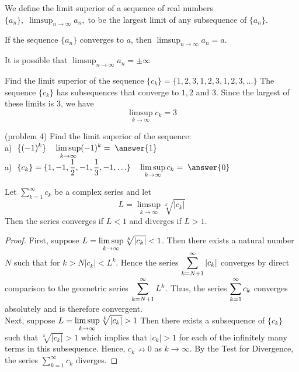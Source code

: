 \documentclass[handout]{ximera}
\begin{document}
\begin{definition}
We define the limit superior of a sequence of real numbers $\{a_n\}, \; \limsup_{n \to \infty} a_n,\;$to be the largest limit of any subsequence of $\{a_n\}$.\
\end{definition}


\begin{remark}
If the sequence $\{a_n\}$ converges to $a$, then $\limsup_{n \to \infty} a_n =a$.
\end{remark}

\begin{remark}
It is possible that $\limsup_{n \to \infty} a_n =\pm\infty$
\end{remark}

\begin{example}[example 4]
Find the limit superior of the sequence $\{c_k\}= \{1, 2, 3, 1, 2, 3, 1, 2, 3, \ldots\}$
The sequence $\{c_k\}$ has subsequences that converge to $1, 2$ and $3$. Since the largest of these limits is $3$, we have
\[
\limsup_{k\to\infty} c_k = 3
\]
\end{example}

\begin{problem}(problem 4)
Find the limit superior of the sequence:\\
a) $\dis\; \{(-1)^k\} \quad \limsup_{k\to\infty} (-1)^k = \; \answer{1}$\\
a) $\dis\; \{c_k\} = \{1, -1, \frac12, -1, \frac13, -1, \ldots\} \quad \limsup_{k\to\infty} c_k = \; \answer{0}$\\
\end{problem}


\begin{theorem}
Let $\displaystyle \sum_{k=1}^\infty c_k$ be a complex series and let 
\[
L = \limsup_{k \to \infty} \sqrt[k]{|c_k|}
\]
Then the series converges if $L <1$ and diverges if $L >1$.
\end{theorem}

\begin{proof}
First, suppose $\displaystyle L = \limsup_{k \to \infty} \sqrt[k]{|c_k|} < 1$. Then there exists a natural number $N$ such that for $k>N 
|c_k| < L^k$.  Hence the series $\displaystyle \sum_{k = N+1}^\infty |c_k|$ converges by direct comparison to the geometric series
$\displaystyle \sum_{k = N+1}^\infty L^k$. Thus, the series $\displaystyle\sum_{k = 1}^\infty c_k$ converges absolutely and is therefore convergent.\\
Next, suppose $\displaystyle L = \limsup_{k \to \infty} \sqrt[k]{|c_k|} > 1$ Then there exists a subsequence of $\{c_k\}$ such that $\sqrt[k]{|c_k|} > 1$
which implies that $|c_k| > 1$ for each of the infinitely many terms in this subsequence. Hence, $c_k \nrightarrow 0$ as $k \to \infty$.
By the Test for Divergence, the series $\displaystyle \sum_{k=1}^\infty c_k$ diverges.
\end{proof}
\end{document}
